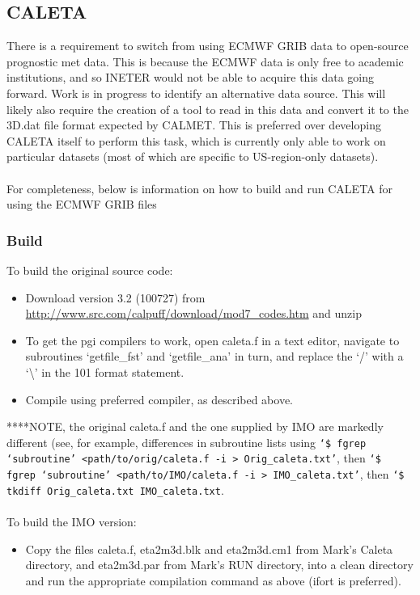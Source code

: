 \documentclass[10pt,a4paper]{article}
\begin{document}
\subsection{CALETA}
There is a requirement to switch from using ECMWF GRIB data to open-source prognostic met data. This is because the ECMWF data is only free to academic institutions, and so INETER would not be able to acquire this data going forward. Work is in progress to identify an alternative data source. This will likely also require the creation of a tool to read in this data and convert it to the 3D.dat file format expected by CALMET. This is preferred over developing CALETA itself to perform this task, which is currently only able to work on particular datasets (most of which are specific to US-region-only datasets).\\\\
For completeness, below is information on how to build and run CALETA for using the ECMWF GRIB files
\subsubsection{Build}
To build the original source code:
\begin{itemize}
\item Download version 3.2 (100727) from \url{http://www.src.com/calpuff/download/mod7_codes.htm} and unzip
\item To get the pgi compilers to work, open caleta.f in a text editor, navigate to subroutines `getfile\_fst' and `getfile\_ana' in turn, and replace the `/' with a `\textbackslash' in the 101 format statement.
\item Compile using preferred compiler, as described above.
\end{itemize}
****NOTE, the original caleta.f and the one supplied by IMO are markedly different (see, for example, differences in subroutine lists using \texttt{`\$ fgrep `subroutine' <path/to/orig/caleta.f -i > Orig\_caleta.txt'}, then \texttt{`\$ fgrep `subroutine' <path/to/IMO/caleta.f -i > IMO\_caleta.txt'}, then \texttt{`\$ tkdiff Orig\_caleta.txt IMO\_caleta.txt}.\\\\
To build the IMO version:
\begin{itemize}
\item Copy the files caleta.f, eta2m3d.blk and eta2m3d.cm1 from Mark's Caleta directory, and eta2m3d.par from Mark's RUN directory, into a clean directory and run the appropriate compilation command as above (ifort is preferred).
\end{itemize}
\end{document}
